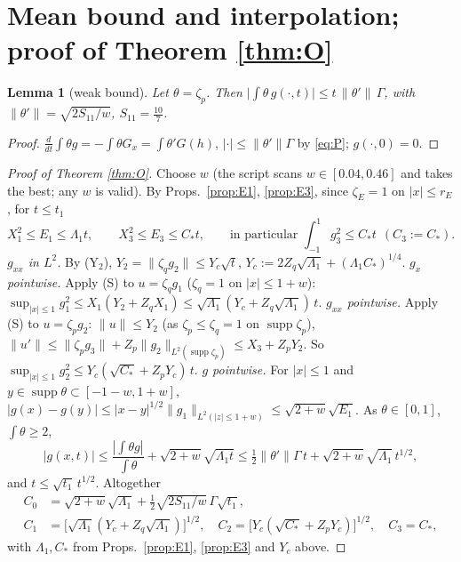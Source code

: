 \documentclass[11pt]{article}
\newtheorem{lemma}[theorem]{Lemma}
\theoremstyle{remark}\newtheorem{remark}[theorem]{Remark}
\newcommand{\nrm}[1]{\lVert #1\rVert}
\begin{document}
\section{Mean bound and interpolation; proof of Theorem \ref{thm:O}}
\begin{lemma}[weak bound]\label{lem:mean}
Let $\theta=\zeta_p$. Then $\big|\int\theta\,g(\cdot,t)\big|\le t\,\nrm{\theta'}\,\Gamma$, with $\nrm{\theta'}=\sqrt{2S_{11}/w}$, $S_{11}=\frac{10}7$.
\end{lemma}
\begin{proof}
$\frac d{dt}\int\theta g=-\int\theta G_x=\int\theta'G(h)$, $|\cdot|\le\nrm{\theta'}\Gamma$ by \eqref{eq:P}; $g(\cdot,0)=0$.
\end{proof}

\begin{proof}[Proof of Theorem \ref{thm:O}]
Choose $w$ (the script scans $w\in[0.04,0.46]$ and takes the best; any $w$ is valid). By Props.\ \ref{prop:E1}, \ref{prop:E3}, since $\zeta_E=1$ on $|x|\le r_E$, for $t\le t_1$
\[
X_1^2\le E_1\le\Lambda_1t,\qquad X_3^2\le E_3\le C_*t,\qquad\text{in particular }\int_{-1}^1g_3^2\le C_*t\ \ (C_3:=C_*).
\]
\emph{$g_{xx}$ in $L^2$.} By (Y$_2$), $Y_2=\nrm{\zeta_qg_2}\le Y_c\sqrt t$, $Y_c:=2Z_q\sqrt{\Lambda_1}+(\Lambda_1C_*)^{1/4}$.
\emph{$g_x$ pointwise.} Apply (S) to $u=\zeta_qg_1$ ($\zeta_q=1$ on $|x|\le1+w$): $\sup_{|x|\le1}g_1^2\le X_1(Y_2+Z_qX_1)\le\sqrt{\Lambda_1}(Y_c+Z_q\sqrt{\Lambda_1})\,t$.
\emph{$g_{xx}$ pointwise.} Apply (S) to $u=\zeta_pg_2$: $\nrm u\le Y_2$ (as $\zeta_p\le\zeta_q=1$ on $\operatorname{supp}\zeta_p$), $\nrm{u'}\le\nrm{\zeta_pg_3}+Z_p\nrm{g_2}_{L^2(\operatorname{supp}\zeta_p)}\le X_3+Z_pY_2$. So $\sup_{|x|\le1}g_2^2\le Y_c(\sqrt{C_*}+Z_pY_c)\,t$.
\emph{$g$ pointwise.} For $|x|\le1$ and $y\in\operatorname{supp}\theta\subset[-1-w,1+w]$, $|g(x)-g(y)|\le|x-y|^{1/2}\nrm{g_1}_{L^2(|z|\le 1+w)}\le\sqrt{2+w}\sqrt{E_1}$. As $\theta\in[0,1]$, $\int\theta\ge2$,
\[
|g(x,t)|\le\frac{|\int\theta g|}{\int\theta}+\sqrt{2+w}\sqrt{\Lambda_1t}\le \tfrac12\nrm{\theta'}\Gamma\,t+\sqrt{2+w}\sqrt{\Lambda_1}\,t^{1/2},
\]
and $t\le\sqrt{t_1}\,t^{1/2}$. Altogether
\begin{equation}\label{eq:consts}
\boxed{\begin{aligned}
C_0&=\sqrt{2+w}\sqrt{\Lambda_1}+\tfrac12\sqrt{2S_{11}/w}\,\Gamma\sqrt{t_1},\\
C_1&=\big[\sqrt{\Lambda_1}(Y_c+Z_q\sqrt{\Lambda_1})\big]^{1/2},\quad
C_2=\big[Y_c(\sqrt{C_*}+Z_pY_c)\big]^{1/2},\quad C_3=C_*,
\end{aligned}}
\end{equation}
with $\Lambda_1,C_*$ from Props.\ \ref{prop:E1}, \ref{prop:E3} and $Y_c$ above.
\end{proof}
\end{document}
